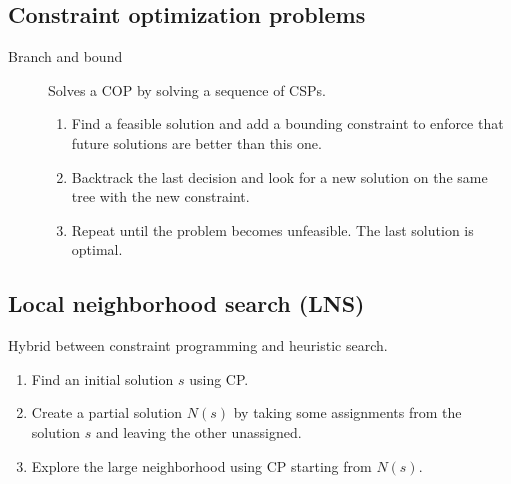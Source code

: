 \subsection{Constraint optimization problems}

\begin{description}
    \item[Branch and bound] 
        Solves a COP by solving a sequence of CSPs.
        \begin{enumerate}
            \item Find a feasible solution and add a bounding constraint 
                to enforce that future solutions are better than this one.
            \item Backtrack the last decision and look for a new solution on the same tree with the new constraint.
            \item Repeat until the problem becomes unfeasible. The last solution is optimal.
        \end{enumerate}
\end{description}


\subsection{Local neighborhood search (LNS)}

Hybrid between constraint programming and heuristic search.
\begin{enumerate}
    \item Find an initial solution $s$ using CP.
    \item Create a partial solution $N(s)$ by taking some assignments from the solution $s$ and leaving the other unassigned.
    \item Explore the large neighborhood using CP starting from $N(s)$.
\end{enumerate}
